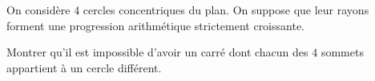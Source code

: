 On considère $4$ cercles concentriques du plan. On suppose que leur rayons forment une progression arithmétique strictement croissante.

Montrer qu'il est impossible d'avoir un carré dont chacun des $4$ sommets appartient à un cercle différent.